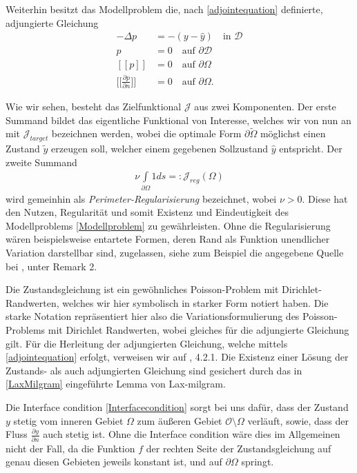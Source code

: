 \begin{defi}[Modellproblem]
	Weiterhin besitzt das Modellproblem die, nach \ref{adjointequation} 				definierte, adjungierte Gleichung 
	\begin{equation}\label{Modelladjoint}
		\begin{aligned}
		-\Delta p &= - (y - \hat{y}) \quad \text{in } \mathcal{D} \\
		p &= 0 \quad \text{auf } \partial\mathcal{D} \\
		[[p]] &= 0 \quad\text{auf } \partial\Omega \\ 
		\Big[\Big[\frac{\partial p}{\partial n}\Big]\Big] &= 0 \quad\text{auf } \partial\Omega.
		\end{aligned}
	\end{equation}	 
\end{defi}

Wie wir sehen, besteht das Zielfunktional $\mathcal{J}$ aus zwei Komponenten. Der erste Summand bildet das eigentliche Funktional von Interesse, welches wir von nun an mit $\mathcal{J}_{target}$ bezeichnen werden, wobei die optimale Form $\partial\tilde{\Omega}$ möglichst einen Zustand $\tilde{y}$ erzeugen soll, welcher einem gegebenen Sollzustand $\hat{y}$ entspricht. Der zweite Summand
\begin{align*}
	\nu\underset{\partial\Omega}{\int} 1 ds =: \mathcal{J}_{reg}(\Omega)
\end{align*}
wird gemeinhin als \textit{Perimeter-Regularisierung} bezeichnet, wobei $\nu > 0$. Diese hat den Nutzen, Regularität und somit Existenz und Eindeutigkeit des Modellproblems \ref{Modellproblem} zu gewährleisten. Ohne die Regularisierung wären beispielsweise entartete Formen, deren Rand als Funktion unendlicher Variation darstellbar sind, zugelassen, siehe zum Beispiel die angegebene Quelle bei \cite{LagrangeNewton}, unter Remark 2.

Die Zustandsgleichung ist ein gewöhnliches Poisson-Problem mit Dirichlet-Randwerten, welches wir hier symbolisch in starker Form notiert haben. Die starke Notation repräsentiert hier also die Variationsformulierung des Poisson-Problems mit Dirichlet Randwerten, wobei gleiches für die adjungierte Gleichung gilt. Für die Herleitung der adjungierten Gleichung, welche mittels \ref{adjointequation} erfolgt, verweisen wir auf \cite{shape_space}, 4.2.1. Die Existenz einer Lösung der  Zustands- als auch adjungierten Gleichung sind gesichert durch das in \ref{LaxMilgram} eingeführte Lemma von Lax-milgram.

Die Interface condition \ref{Interfacecondition} sorgt bei uns dafür, dass der Zustand $y$ stetig vom inneren Gebiet $\Omega$ zum äußeren Gebiet $\mathcal{O} \setminus \Omega$ verläuft, sowie, dass der Fluss $\frac{\partial y }{\partial n}$ auch stetig ist. Ohne die Interface condition wäre dies im Allgemeinen nicht der Fall, da die Funktion $f$ der rechten Seite der Zustandsgleichung auf genau diesen Gebieten jeweils konstant ist, und auf $\partial\Omega$ springt.

